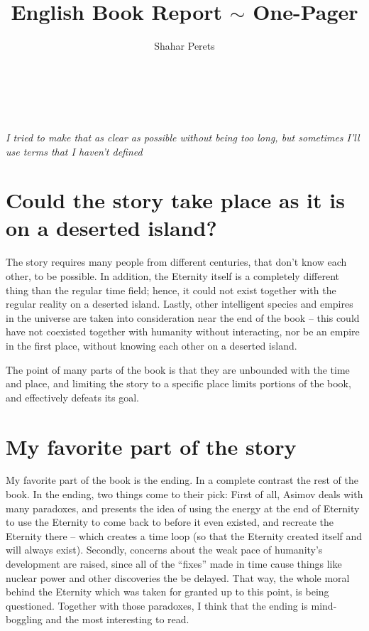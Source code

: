\documentclass[]{article}
\author{{Shahar Perets}}
\title{English Book Report $\sim$ One-Pager}
\begin{document}
    \,
    \vfil
    \hfil {}
    \\ \,
    \normalsize
    
    \begin{center}
           \textit{I tried to make that as clear as possible without being too long, but sometimes I'll use terms that I haven't defined}
    \end{center}
    \begin{multicols}{2}
        \section{Could the story take place as it is on a deserted island?}
        {\sf The story requires many people from different centuries, that don't know each other, to be possible. In addition, the Eternity itself is a completely different thing than the regular time field; hence, it could not exist together with the regular reality on a deserted island. Lastly, other intelligent species and empires in the universe are taken into consideration near the end of the book -- this could have not coexisted together with humanity without interacting, nor be an empire in the first place, without knowing each other on a deserted island. 
            
            The point of many parts of the book is that they are unbounded with the time and place, and limiting the story to a specific place limits portions of the book, and effectively defeats its goal. }
        
        \vfill\null
        \columnbreak
        
        \section{My favorite part of the story}
        {\sf My favorite part of the book is the ending. In a complete contrast the rest of the book. In the ending, two things come to their pick: First of all, Asimov deals with many paradoxes, and presents the idea of using the energy at the end of Eternity to use the Eternity to come back to before it even existed, and recreate the Eternity there -- which creates a time loop (so that the Eternity created itself and will always exist). Secondly, concerns about the weak pace of humanity's development are raised, since all of the ``fixes'' made in time cause things like nuclear power and other discoveries the be delayed. That way, the whole moral behind the Eternity which was taken for granted up to this point, is being questioned. Together with those paradoxes, I think that the ending is mind-boggling and the most interesting to read. }
        \vfill\null
        \end{multicols}
\end{document}
